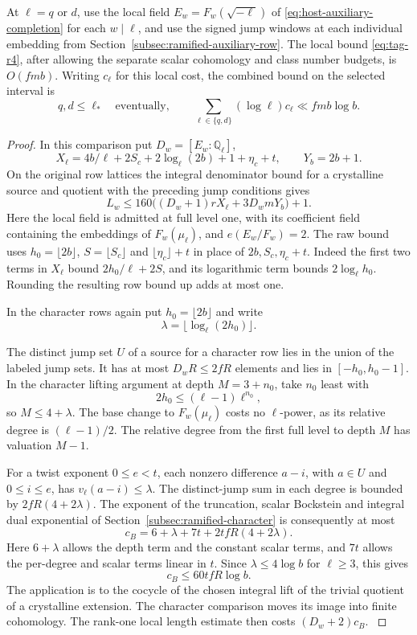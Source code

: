 \begin{proposition}\label{prop:auxiliary-prime-row-length}
At \(\ell=q\) or \(d\), use the local field
\(E_w=F_w(\sqrt{-\ell})\) of \eqref{eq:host-auxiliary-completion}
for each \(w\mid\ell\), and
use the signed jump windows at each individual embedding
from Section~\ref{subsec:ramified-auxiliary-row}.
The local bound \eqref{eq:tag-r4}, after allowing the separate scalar
cohomology and class number budgets, is \(O(fmb)\).
Writing \(c_\ell\) for this local cost, the combined bound on the selected interval is
\[
 q,d\le\ell_*\quad\text{eventually},\qquad \sum_{\ell\in\{q,d\}}(\log\ell)c_\ell\ll fmb\log b.
\]
\end{proposition}

\begin{proof}
In this comparison put \(D_w=[E_w:\mathbb Q_\ell]\),
\[
 X_\ell=4b/\ell+2S_c+2\log_\ell(2b)+1+\eta_c+t,\qquad
 Y_b=2b+1.
\]
On the original row lattices the integral denominator
bound for a crystalline source and quotient with
the preceding jump conditions gives
\[
 L_w\le 160\bigl((D_w+1)r X_\ell+3D_wmY_b\bigr)+1 .
 \tag{R1}\label{eq:tag-r1}
\]
Here the local field is admitted at full level one,
with its coefficient field containing the embeddings
of \(F_w(\mu_\ell)\), and \(e(E_w/F_w)=2\).
The raw bound uses \(h_0=\lfloor2b\rfloor\),
\(S=\lfloor S_c\rfloor\) and
\(\lfloor\eta_c\rfloor+t\) in place of \(2b,S_c,\eta_c+t\).
Indeed the first two terms in \(X_\ell\) bound
\(2h_0/\ell+2S\), and its logarithmic term bounds
\(2\log_\ell h_0\). Rounding the resulting row bound up
adds at most one.

In the character rows again put \(h_0=\lfloor2b\rfloor\)
and write
\[
 \lambda=\lfloor\log_\ell(2h_0)\rfloor.
\]

The distinct jump set \(U\) of a source for a character
row lies in the union of the labeled jump sets. It
has at most \(D_wR\le2fR\) elements and lies in
\([-h_0,h_0-1]\). In the character lifting argument
at depth \(M=3+n_0\), take \(n_0\) least with
\[
 2h_0\le(\ell-1)\ell^{n_0},
\]
so \(M\le4+\lambda\).
The base change to \(F_w(\mu_\ell)\) costs no
\(\ell\)-power, as its relative degree is
\((\ell-1)/2\). The relative degree from
the first full level to depth \(M\) has valuation
\(M-1\).

For a twist exponent \(0\le e<t\), each nonzero
difference \(a-i\), with \(a\in U\) and
\(0\le i\le e\), has \(v_\ell(a-i)\le\lambda\).
The distinct-jump sum in each degree is bounded by
\(2fR(4+2\lambda)\). The exponent of the
truncation, scalar Bockstein and integral dual
exponential of Section~\ref{subsec:ramified-character}
is consequently at most
\[
 c_B=6+\lambda+7t+2tfR(4+2\lambda).
\]
Here \(6+\lambda\) allows the depth term and the
constant scalar terms, and \(7t\) allows the
per-degree and scalar terms linear in \(t\).
Since \(\lambda\le4\log b\) for \(\ell\ge3\), this gives
\[
                  c_B\le60tfR\log b .
 \tag{R2}\label{eq:tag-r2}
\]
The application is to the cocycle of the chosen
integral lift of the trivial quotient of a crystalline
extension. The character comparison moves its image
into finite cohomology. The rank-one local length
estimate then costs \((D_w+2)c_B\).
\label{cor:special-prime-lengths-9}


\end{proof}
